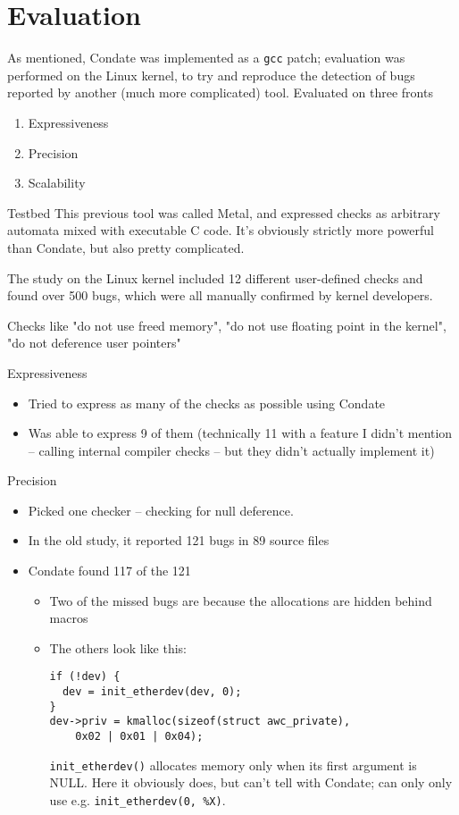 \documentclass{beamer}
\begin{document}
\section{Evaluation}
\begin{frame}
As mentioned, Condate was implemented as a {\tt gcc} patch; evaluation
was performed on the Linux kernel, to try and reproduce the detection
of bugs reported by another (much more complicated) tool. Evaluated on
three fronts
\begin{enumerate}
\item Expressiveness
\item Precision
\item Scalability
\end{enumerate}
\end{frame}

\begin{frame}{Testbed}
This previous tool was called Metal, and expressed checks as arbitrary
automata mixed with executable C code. It's obviously strictly more
powerful than Condate, but also pretty complicated.

The study on the Linux kernel included 12 different user-defined checks
and found over 500 bugs, which were all manually confirmed by kernel
developers.

Checks like "do not use freed memory", "do not use floating point in the
kernel", "do not deference user pointers"
\end{frame}

\begin{frame}{Expressiveness}
\begin{itemize}
\item Tried to express as many of the checks as possible using Condate
\item Was able to express 9 of them (technically 11 with a feature I
didn't mention -- calling internal compiler checks -- but they didn't
actually implement it)
\end{itemize}
\end{frame}

\begin{frame}[fragile]{Precision}
\begin{itemize}
\item Picked one checker -- checking for null deference.
\item In the old study, it reported 121 bugs in 89 source files
\item Condate found 117 of the 121
\begin{itemize}
\item Two of the missed bugs are because the allocations are hidden
behind macros
\item The others look like this:
\begin{verbatim}
if (!dev) {
  dev = init_etherdev(dev, 0);
}
dev->priv = kmalloc(sizeof(struct awc_private),
    0x02 | 0x01 | 0x04);
\end{verbatim}
{\tt init\_etherdev()} allocates memory only when its first argument is
NULL. Here it obviously does, but can't tell with Condate; can only only
use e.g. {\tt init\_etherdev(0, \%X)}.
\end{itemize}
\end{itemize}
\end{frame}
\end{document}
